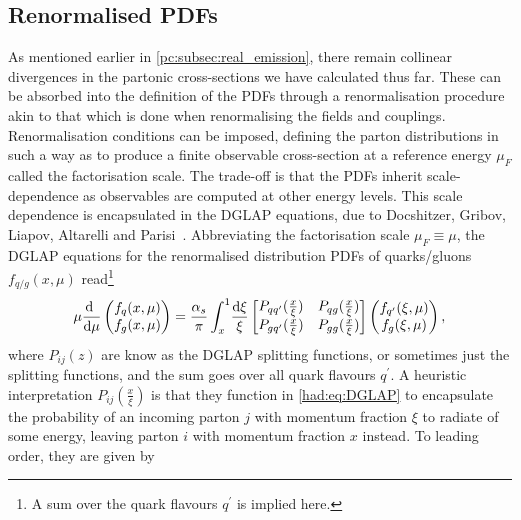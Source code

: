 \documentclass[../main.tex]{subfiles}
\begin{document}
\subsection{Renormalised PDFs}
\label{had:subsec:renormalised_pdfs}
As mentioned earlier in \cref{pc:subsec:real_emission}, there remain collinear divergences in the partonic cross-sections we have calculated thus far.
These can be absorbed into the definition of the PDFs through a renormalisation procedure akin to that which is done when renormalising the fields and couplings.
Renormalisation conditions can be imposed, defining the parton distributions in such a way as to produce a finite observable cross-section at a reference energy \(\mu_F\) called the factorisation scale.
The trade-off is that the PDFs inherit scale-dependence as observables are computed at other energy levels.
This scale dependence is encapsulated in the DGLAP equations, due to Docshitzer, Gribov, Liapov, Altarelli and Parisi~\cite{DGLAP-D,DGLAP-GL,Altarelli:1977zs}.
Abbreviating the factorisation scale \(\mu_F \equiv \mu\), the DGLAP equations for the renormalised distribution PDFs of quarks/gluons \(f_{q/g}(x, \mu)\) read\footnote{A sum over the quark flavours \(q^\prime\) is implied here.}
\begin{equation}
  \label{had:eq:DGLAP}
  \mu \d[\mu]\ \begin{pmatrix} f_q(x, \mu) \\ f_g(x, \mu) \end{pmatrix} = \frac{\alpha_s}{\pi} \int_x^1 \! \frac{\mathrm{d}\xi}{\xi} \begin{bmatrix} P_{qq^\prime}(\frac{x}{\xi}) & P_{qg}(\frac{x}{\xi}) \\ P_{gq^\prime}(\frac{x}{\xi}) & P_{gg}(\frac{x}{\xi}) \end{bmatrix} \begin{pmatrix}
    f_{q^\prime}(\xi, \mu) \\ f_g(\xi, \mu)
  \end{pmatrix},
\end{equation}
where \(P_{ij}(z)\) are know as the DGLAP splitting functions, or sometimes just the splitting functions, and the sum goes over all quark flavours \(q^\prime\).
A heuristic interpretation \(P_{ij}(\frac{x}{\xi})\) is that they function in \cref{had:eq:DGLAP} to encapsulate the probability of an incoming parton \(j\) with momentum fraction \(\xi\) to radiate of some energy, leaving parton \(i\) with momentum fraction \(x\) instead.
To leading order, they are given by~\cite{Schwartz:2014sze}
\end{document}
